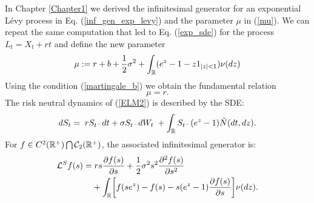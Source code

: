In Chapter \ref{Chapter1} we derived the infinitesimal generator for an exponential Lévy process in Eq. (\ref{inf_gen_exp_levy}) and the 
parameter $\mu$ in (\ref{mu}).
We can repeat the same computation that led to Eq. (\ref{exp_sde}) for the process $L_t = X_t + rt$ and define the new parameter
\begin{equation}\label{mu2}
 \mu := r + b + \frac{1}{2}\sigma^2 + \int_{\mathbb{R}} ( e^{z} - 1 -z1_{|z|<1}) \nu(dz)
\end{equation}
Using the condition (\ref{martingale_b}) we obtain the fundamental relation
\begin{equation}\label{mu=r}
 \mu = r.
\end{equation}
The risk neutral dynamics of (\ref{ELM2}) is described by the SDE:
\begin{equation}\label{RN_sde}
 d S_t = \; r S_{t^-} dt +  \sigma S_{t^-} dW_t \; + \int_{\mathbb{R}} S_{t^-} (e^{z} - 1) \tilde N(dt,dz). 
\end{equation}
For $f \in C^{2}(\mathbb{R}^+) \bigcap \mathcal{C}_2(\mathbb{R}^+)$, the associated infinitesimal generator is:
\begin{align}\label{RN_inf_gen}
 \mathcal{L}^S f(s) =& \; r s \frac{\partial f(s)}{\partial s}
+ \frac{1}{2} \sigma^2 s^2 \frac{\partial^2  f(s)}{\partial s^2}  \\ \nonumber
&+ \int_{\mathbb{R}} \biggl[ f(se^z) - f(s) - s(e^z-1)\frac{\partial f(s)}{\partial s} \biggr] \nu(dz).
\end{align}

